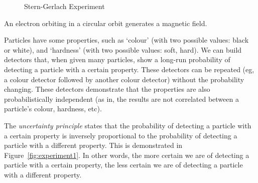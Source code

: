 \begin{figure}[htp]
\caption{Stern-Gerlach Experiment}\label{fig:stern_gerlach}\end{figure}
\begin{note}
    An electron orbiting in a circular orbit generates a magnetic field.
\end{note}
Particles have some properties, such as `colour' (with two possible values: black or white), and `hardness' (with two possible values: soft, hard). We can build detectors that, when given many particles, show a long-run probability of detecting a particle with a certain property. These detectors can be repeated (eg, a colour detector followed by another colour detector) without the probability changing. These detectors demonstrate that the properties are also probabilistically independent (as in, the results are not correlated between a particle's colour, hardness, etc).

\begin{definition}
    The \emph{uncertainty principle} states that the probability of detecting a particle with a certain property is inversely proportional to the probability of detecting a particle with a different property. This is demonstrated in Figure~\ref{fig:experiment1}. In other words, the more certain we are of detecting a particle with a certain property, the less certain we are of detecting a particle with a different property.
\end{definition}

